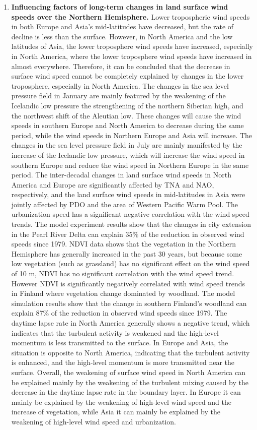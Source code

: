 \begin{enumerate}
\item  \textbf{Influencing factors of long-term changes in land surface wind speeds over the Northern Hemisphere.} Lower tropospheric wind speeds in both Europe and Asia's mid-latitudes have decreased, but the rate of decline is less than the surface. However, in North America and the low latitudes of Asia, the lower troposphere wind speeds have increased, especially in North America, where the lower troposphere wind speeds have increased in almost everywhere. Therefore, it can be concluded that the decrease in surface wind speed cannot be completely explained by changes in the lower troposphere, especially in North America. The changes in the sea level pressure field in January are mainly featured by the weakening of the Icelandic low pressure the strengthening of the northern Siberian high, and the northwest shift of the Aleutian low. These changes will cause the wind speeds in southern Europe and North America to decrease during the same period, while the wind speeds in Northern Europe and Asia will increase. The changes in the sea level pressure field in July are mainly manifested by the increase of the Icelandic low pressure, which will increase the wind speed in southern Europe and reduce the wind speed in Northern Europe in the same period. The inter-decadal changes in land surface wind speeds in North America and Europe are significantly affected by TNA and NAO, respectively, and the land surface wind speeds in mid-latitudes in Asia were jointly affected by PDO and the area of Western Pacific Warm Pool. The urbanization speed has a significant negative correlation with the wind speed trends. The model experiment results show that the changes in city extension in the Pearl River Delta can explain 35\% of the reduction in observed wind speeds since 1979. NDVI data shows that the vegetation in the Northern Hemisphere has generally increased in the past 30 years, but because some low vegetation (such as grassland) has no significant effect on the wind speed of 10 m, NDVI has no significant correlation with the wind speed trend. However NDVI is significantly negatively correlated with wind speed trends in Finland where vegetation change dominated by woodland. The model simulation results show that the change in southern Finland's woodland can explain 87\% of the reduction in observed wind speeds since 1979. The daytime lapse rate in North America generally shows a negative trend, which indicates that the turbulent activity is weakened and the high-level momentum is less transmitted to the surface. In Europe and Asia, the situation is opposite to North America, indicating that the turbulent activity is enhanced, and the high-level momentum is more transmitted near the surface. Overall, the weakening of surface wind speed in North America can be explained mainly by the weakening of the turbulent mixing caused by the decrease in the daytime lapse rate in the boundary layer. In Europe it can mainly be explained by the weakening of high-level wind speed and the increase of vegetation, while Asia it can mainly be explained by the weakening of high-level wind speed and urbanization.


\end{enumerate}

